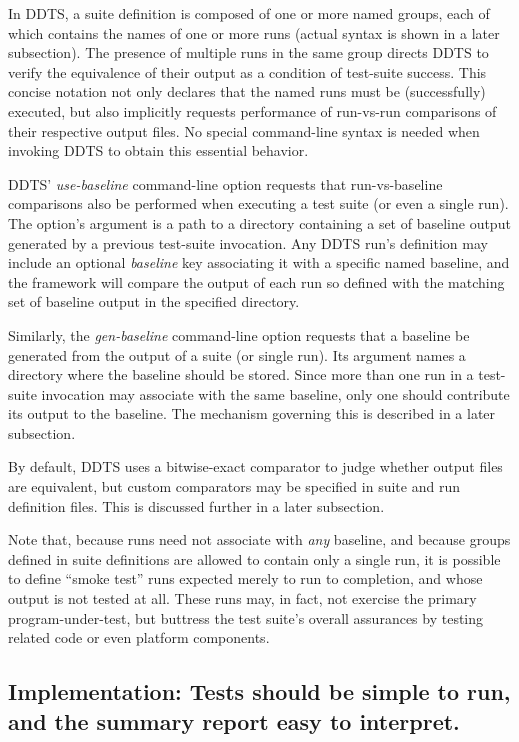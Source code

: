 \documentclass[conference]{IEEEtran}
\begin{document}
In DDTS, a suite definition is composed of one or more named groups, each of which contains the names of one or more runs (actual syntax is shown in a later subsection). The presence of multiple runs in the same group directs DDTS to verify the equivalence of their output as a condition of test-suite success. This concise notation not only declares that the named runs must be (successfully) executed, but also implicitly requests performance of run-vs-run comparisons of their respective output files. No special command-line syntax is needed when invoking DDTS to obtain this essential behavior.

DDTS' \emph{use-baseline} command-line option requests that run-vs-baseline comparisons also be performed when executing a test suite (or even a single run). The option's argument is a path to a directory containing a set of baseline output generated by a previous test-suite invocation. Any DDTS run's definition may include an optional \emph{baseline} key associating it with a specific named baseline, and the framework will compare the output of each run so defined with the matching set of baseline output in the specified directory.

Similarly, the \emph{gen-baseline} command-line option requests that a baseline be generated from the output of a suite (or single run). Its argument names a directory where the baseline should be stored. Since more than one run in a test-suite invocation may associate with the same baseline, only one should contribute its output to the baseline. The mechanism governing this is described in a later subsection.

By default, DDTS uses a bitwise-exact comparator to judge whether output files are equivalent, but custom comparators may be specified in suite and run definition files. This is discussed further in a later subsection.

Note that, because runs need not associate with \emph{any} baseline, and because groups defined in suite definitions are allowed to contain only a single run, it is possible to define ``smoke test'' runs expected merely to run to completion, and whose output is not tested at all. These runs may, in fact, not exercise the primary program-under-test, but buttress the test suite's overall assurances by testing related code or even platform components.

\subsection{Implementation: Tests should be simple to run, and the summary report easy to interpret.}
\end{document}
